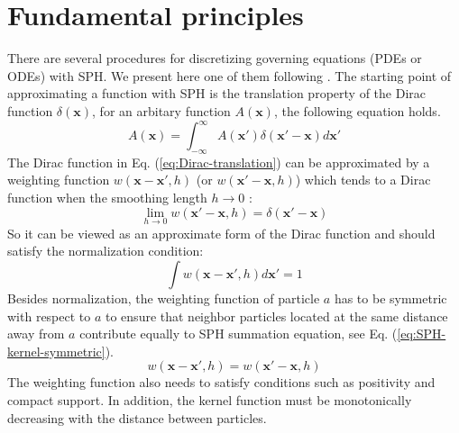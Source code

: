 \section{Fundamental principles}
There are several procedures for discretizing governing equations (PDEs or ODEs) with SPH. We present here one of them following \citet{monaghan1992smoothed, monaghan2005smoothed, monaghan2012smoothed}. The starting point of approximating a function with SPH is the translation property of the Dirac function $\delta(\textbf{x})$, for an arbitary function $A(\textbf{x})$, the following equation holds. 
\begin{equation}
A\left(\textbf{x}\right)=\int_{-\infty}^{\infty} A\left(\textbf{x} \prime\right) \delta \left(\textbf{x} \prime - \textbf{x}\right) d\textbf{x} \prime
\label{eq:Dirac-translation}
\end{equation}
The Dirac function in Eq. (\ref{eq:Dirac-translation}) can be approximated by a weighting function $w\left(\textbf{x}-\textbf{x}\prime, h\right)$ (or $w\left(\textbf{x}\prime-\textbf{x}, h\right)$) which tends to a Dirac function when the smoothing length $h \rightarrow 0$ :
\begin{equation}
\lim _{h \rightarrow 0} w\left(\textbf{x} \prime-\textbf{x}, h\right) =  \delta \left(\textbf{x} \prime - \textbf{x}\right)
\label{eq:SPH_kernel_delta}
\end{equation}
So it can be viewed as an approximate form of the Dirac function and should satisfy the normalization condition:
\begin{equation}
\int	 w\left(\textbf{x}-\textbf{x}\prime, h\right) d\textbf{x}\prime = 1
\label{eq:SPH-kernel-normalization-prop}
\end{equation}
Besides normalization, the weighting function of particle $a$ has to be symmetric with respect to $a$ to ensure that neighbor particles located at the same distance away from $a$ contribute equally to SPH summation equation, see Eq. (\ref{eq:SPH-kernel-symmetric}).
\begin{equation}
w\left(\textbf{x}- \textbf{x} \prime, h\right) = w\left(\textbf{x} \prime - \textbf{x}, h\right)
\label{eq:SPH-kernel-symmetric}
\end{equation}
The weighting function also needs to satisfy conditions such as positivity and compact support. In addition, the kernel function must be monotonically decreasing with the distance between particles.

